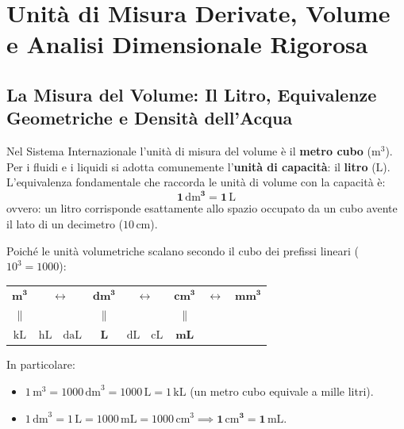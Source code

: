 \documentclass[11pt,a4paper,oneside]{report}
\begin{document}
\chapter{Unit\`a di Misura Derivate, Volume e Analisi Dimensionale Rigorosa}

\section{La Misura del Volume: Il Litro, Equivalenze Geometriche e Densit\`a dell'Acqua}

\begin{definizione}
Nel Sistema Internazionale l'unit\`a di misura del volume \`e il \textbf{metro cubo} ($\mathrm{m}^3$). Per i fluidi e i liquidi si adotta comunemente l'\textbf{unit\`a di capacit\`a}: il \textbf{litro} ($\mathrm{L}$).
L'equivalenza fondamentale che raccorda le unit\`a di volume con la capacit\`a \`e:
\begin{equation}
    \mathbf{1\,\mathrm{dm}^3 = 1\,\mathrm{L}}
\end{equation}
ovvero: un litro corrisponde esattamente allo spazio occupato da un cubo avente il lato di un decimetro ($10\,\mathrm{cm}$).
\end{definizione}

\begin{metodo}
Poich\'e le unit\`a volumetriche scalano secondo il cubo dei prefissi lineari ($10^3 = 1000$):
\begin{center}
\renewcommand{\arraystretch}{1.3}
\begin{tabular}{ccccccc}
$\mathbf{m^3}$ & $\longleftrightarrow$ & $\mathbf{dm^3}$ & $\longleftrightarrow$ & $\mathbf{cm^3}$ & $\longleftrightarrow$ & $\mathbf{mm^3}$ \\
$\parallel$ & & $\parallel$ & & $\parallel$ & & \\
$\mathrm{kL}$ & $\mathrm{hL}\quad\mathrm{daL}$ & $\mathbf{L}$ & $\mathrm{dL}\quad\mathrm{cL}$ & $\mathbf{mL}$ & & \\
\end{tabular}
\end{center}
In particolare:
\begin{itemize}[leftmargin=2em]
    \item $1\,\mathrm{m}^3 = 1000\,\mathrm{dm}^3 = 1000\,\mathrm{L} = 1\,\mathrm{kL}$ (un metro cubo equivale a mille litri).
    \item $1\,\mathrm{dm}^3 = 1\,\mathrm{L} = 1000\,\mathrm{mL} = 1000\,\mathrm{cm}^3 \implies \mathbf{1\,\mathrm{cm}^3 = 1\,\mathrm{mL}}$.
\end{itemize}
\end{metodo}
\end{document}
